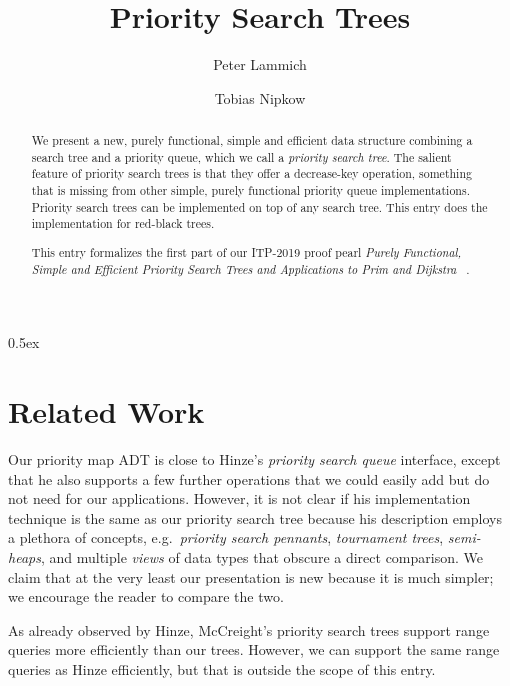 \documentclass[11pt,a4paper]{article}
\begin{document}
\title{Priority Search Trees}
\author{Peter Lammich \and Tobias Nipkow}
\maketitle

\begin{abstract}
We present a new, purely functional, simple and efficient data structure
combining a search tree and a priority queue, which we call a \emph{priority search tree}.
The salient feature of priority search trees is that they offer
a decrease-key operation, something that is missing from other simple, purely functional priority queue
implementations. Priority search trees can be implemented on top of any search tree.
This entry does the implementation for red-black trees.

This entry formalizes the first part of our ITP-2019 proof
pearl \emph{Purely Functional, Simple and Efficient Priority Search Trees and Applications to Prim and Dijkstra}
~\cite{LaNi19}.
\end{abstract}

\clearpage

\tableofcontents

\parindent 0pt\parskip 0.5ex



\section{Related Work}
Our priority map ADT is close to Hinze's \cite{DBLP:conf/icfp/Hinze01} \emph{priority search queue}
interface, except that he also supports a few further operations that we could easily add but do not
need for our applications. However, it is not clear if his implementation technique is the same as
our priority search tree because his description employs a plethora of concepts, e.g.\
\emph{priority search pennants}, \emph{tournament trees}, \emph{semi-heaps}, and multiple
\emph{views} of data types that obscure a direct comparison. We claim that at the very least our
presentation is new because it is much simpler; we encourage the reader to compare the two.

As already observed by Hinze, McCreight's \cite{McCreight85} priority search trees support range
queries more efficiently than our trees. However, we can support the same range queries as Hinze
efficiently, but that is outside the scope of this entry.



\end{document}
